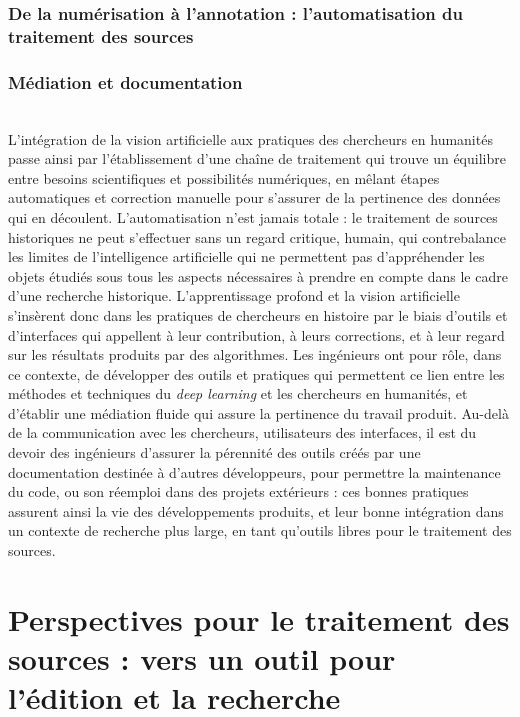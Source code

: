 \documentclass[a4paper,12pt,twoside]{book}
\newcommand{\dl}{\textit{deep learning}\xspace}
\newcommand{\ia}{intelligence artificielle\xspace}
\newcommand{\clearemptydoublepage}{\newpage{\pagestyle{empty}\cleardoublepage}}
\begin{document}
                \section[\textit{Workflow} de traitement des sources]{De la numérisation à l’annotation : l'automatisation du traitement des sources}
                    
             
                \section{Médiation et documentation}
                    
        \\
        
        L'intégration de la vision artificielle aux pratiques des chercheurs en humanités passe ainsi par l'établissement d'une chaîne de traitement qui trouve un équilibre entre besoins scientifiques et possibilités numériques, en mêlant étapes automatiques et correction manuelle pour s'assurer de la pertinence des données qui en découlent. L'automatisation n'est jamais totale : le traitement de sources historiques ne peut s'effectuer sans un regard critique, humain, qui contrebalance les limites de l'\ia qui ne permettent pas d'appréhender les objets étudiés sous tous les aspects nécessaires à prendre en compte dans le cadre d'une recherche historique. L'apprentissage profond et la vision artificielle s'insèrent donc dans les pratiques de chercheurs en histoire par le biais d'outils et d'interfaces qui appellent à leur contribution, à leurs corrections, et à leur regard sur les résultats produits par des algorithmes. Les ingénieurs ont pour rôle, dans ce contexte, de développer des outils et pratiques qui permettent ce lien entre les méthodes et techniques du \dl et les chercheurs en humanités, et d'établir une médiation fluide qui assure la pertinence du travail produit. Au-delà de la communication avec les chercheurs, utilisateurs des interfaces, il est du devoir des ingénieurs d'assurer la pérennité des outils créés par une documentation destinée à d'autres développeurs, pour permettre la maintenance du code, ou son réemploi dans des projets extérieurs : ces bonnes pratiques assurent ainsi la vie des développements produits, et leur bonne intégration dans un contexte de recherche plus large, en tant qu'outils libres pour le traitement des sources.
        \clearemptydoublepage

    \part{Perspectives pour le traitement des sources : vers un outil pour l’édition et la recherche}
\end{document}
